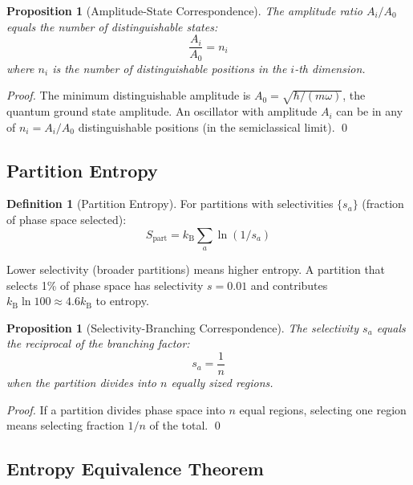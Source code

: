 \documentclass[twocolumn,10pt]{article}
\newtheorem{proposition}[theorem]{Proposition}
\theoremstyle{definition}
\newtheorem{definition}[theorem]{Definition}
\theoremstyle{remark}
\newcommand{\kB}{k_{\mathrm{B}}}
\begin{document}
\begin{proposition}[Amplitude-State Correspondence]
\label{prop:amplitude}
The amplitude ratio $A_i/A_0$ equals the number of distinguishable states:
\begin{equation}
\frac{A_i}{A_0} = n_i
\end{equation}
where $n_i$ is the number of distinguishable positions in the $i$-th dimension.
\end{proposition}

\begin{proof}
The minimum distinguishable amplitude is $A_0 = \sqrt{\hbar/(m\omega)}$, the quantum ground state amplitude. An oscillator with amplitude $A_i$ can be in any of $n_i = A_i/A_0$ distinguishable positions (in the semiclassical limit). \qed
\end{proof}

\subsection{Partition Entropy}

\begin{definition}[Partition Entropy]
\label{def:part_entropy}
For partitions with selectivities $\{s_a\}$ (fraction of phase space selected):
\begin{equation}
S_{\text{part}} = \kB \sum_a \ln(1/s_a)
\label{eq:partition_entropy}
\end{equation}
\end{definition}

Lower selectivity (broader partitions) means higher entropy. A partition that selects 1\% of phase space has selectivity $s = 0.01$ and contributes $\kB \ln 100 \approx 4.6\kB$ to entropy.

\begin{proposition}[Selectivity-Branching Correspondence]
\label{prop:selectivity}
The selectivity $s_a$ equals the reciprocal of the branching factor:
\begin{equation}
s_a = \frac{1}{n}
\end{equation}
when the partition divides into $n$ equally sized regions.
\end{proposition}

\begin{proof}
If a partition divides phase space into $n$ equal regions, selecting one region means selecting fraction $1/n$ of the total. \qed
\end{proof}

\subsection{Entropy Equivalence Theorem}
\end{document}
